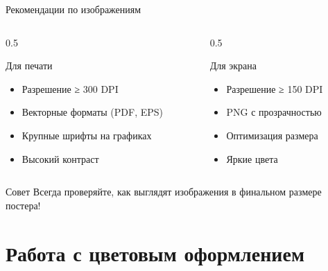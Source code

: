 \documentclass[aspectratio=169]{beamer}
\begin{document}
\begin{frame}{Рекомендации по изображениям}
    \begin{columns}[T]
        \begin{column}{0.5\textwidth}
            \begin{block}{Для печати}
                \begin{itemize}
                    \item Разрешение ≥ 300 DPI
                    \item Векторные форматы (PDF, EPS)
                    \item Крупные шрифты на графиках
                    \item Высокий контраст
                \end{itemize}
            \end{block}
        \end{column}
        
        \begin{column}{0.5\textwidth}
            \begin{block}{Для экрана}
                \begin{itemize}
                    \item Разрешение ≥ 150 DPI
                    \item PNG с прозрачностью
                    \item Оптимизация размера
                    \item Яркие цвета
                \end{itemize}
            \end{block}
        \end{column}
    \end{columns}
    
    \vspace{0.3cm}
    
    \begin{alertblock}{Совет}
        Всегда проверяйте, как выглядят изображения в финальном размере постера!
    \end{alertblock}
\end{frame}

\section{Работа с цветовым оформлением}
\end{document}
